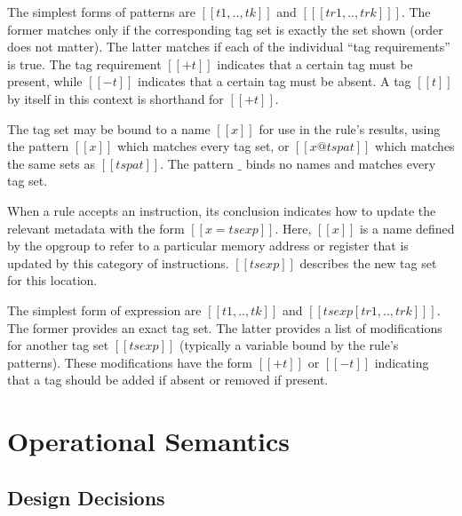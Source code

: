 \documentclass[12pt]{article}
\newif\ifdraft
\newcommand{\cjc}[1]{\ifdraft{\color{Blue}[\textbf{CJC}: #1]}\fi}
\begin{document}
The simplest forms of patterns are $[[{t1,..,tk}]]$ and $[[ [tr1,..,trk] ]]$.
The former matches only if the corresponding tag set is exactly the set shown
(order does not matter).  The latter matches if each of the individual ``tag
requirements'' is true.  The tag requirement $[[+t]]$ indicates that a certain
tag must be present, while $[[-t]]$ indicates that a certain tag must be absent.
A tag $[[t]]$ by itself in this context is shorthand for $[[+t]]$.

The tag set may be bound to a name $[[x]]$ for use in the rule's results, using
the pattern $[[x]]$ which matches every tag set, or $[[x@tspat]]$ which matches
the same sets as $[[tspat]]$.  The pattern $\_$ binds no names and matches
every tag set.

\bigskip

\ottgrammartabular{
\otttspats\ottinterrule
\otttspat\ottinterrule
\otttr\ottafterlastrule
}

\bigskip

When a rule accepts an instruction, its conclusion indicates how to update the
relevant metadata with the form $[[x = tsexp]]$.  Here, $[[x]]$ is a name defined
by the opgroup to refer to a particular memory address or register that is
updated by this category of instructions.  $[[tsexp]]$ describes the new tag set
for this location.

The simplest form of expression are $[[{t1, .. , tk}]]$ and
$[[tsexp[tr1, .., trk] ]]$.  The former provides an exact tag set.  The latter
provides a list of modifications for another tag set $[[tsexp]]$ (typically a
variable bound by the rule's patterns).  These modifications have the form
$[[+t]]$ or $[[-t]]$ indicating that a tag should be added if absent or removed
if present.

\cjc{The union and intersection forms are a little messy.  If you try to union
  two sets containing two different colors in the heap policy, you get a dynamic
  error.}

\bigskip

\ottgrammartabular{
\otttsexps\ottinterrule
\otttsexp\ottafterlastrule
}


\section{Operational Semantics}
\label{sec:opsem}

\subsection{Design Decisions}
\end{document}
